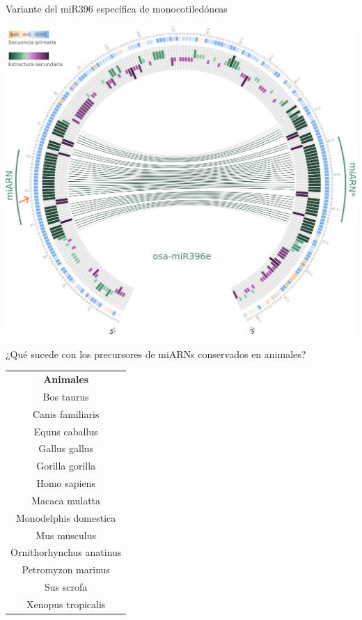 \documentclass{beamer}
\begin{document}
\begin{frame}{Variante del miR396 específica de monocotiledóneas}
	\begin{center}
		\includegraphics[width=.6\textwidth]{img/circos_monocots_miR396e.png}
	\end{center}
    \begin{center}
    \end{center}
\end{frame}


\begin{frame}{¿Qué sucede con los precursores de miARNs conservados en animales?}
\begin{table}[]
    \centering
    \tiny
    \begin{tabular}{c}
    \textbf{Animales}        \\
        Bos taurus               \\
        Canis familiaris         \\
        Equus caballus           \\
        Gallus gallus            \\
        Gorilla gorilla          \\
        Homo sapiens             \\
        Macaca mulatta           \\
        Monodelphis domestica    \\
        Mus musculus             \\
        Ornithorhynchus anatinus \\
        Petromyzon marinus       \\
        Sus scrofa               \\
        Xenopus tropicalis      
    \end{tabular}
    \end{table}
\end{frame}
\end{document}
